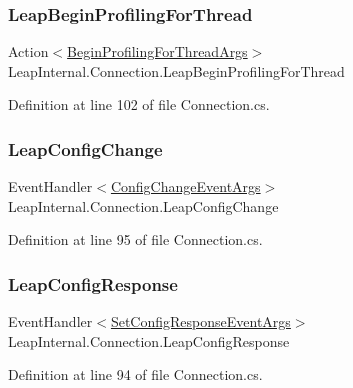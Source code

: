 \subsubsection{\texorpdfstring{LeapBeginProfilingForThread}{LeapBeginProfilingForThread}}
{\footnotesize\ttfamily Action$<$\mbox{\hyperlink{struct_leap_1_1_begin_profiling_for_thread_args}{Begin\+Profiling\+For\+Thread\+Args}}$>$ Leap\+Internal.\+Connection.\+Leap\+Begin\+Profiling\+For\+Thread}



Definition at line 102 of file Connection.\+cs.

\mbox{\label{class_leap_internal_1_1_connection_a6f56c66bbecc957ca227d894dcf16e96}} 
\subsubsection{\texorpdfstring{LeapConfigChange}{LeapConfigChange}}
{\footnotesize\ttfamily Event\+Handler$<$\mbox{\hyperlink{class_leap_1_1_config_change_event_args}{Config\+Change\+Event\+Args}}$>$ Leap\+Internal.\+Connection.\+Leap\+Config\+Change}



Definition at line 95 of file Connection.\+cs.

\mbox{\label{class_leap_internal_1_1_connection_a87dae2d17dfa76d622d710bf69c08c82}} 
\subsubsection{\texorpdfstring{LeapConfigResponse}{LeapConfigResponse}}
{\footnotesize\ttfamily Event\+Handler$<$\mbox{\hyperlink{class_leap_1_1_set_config_response_event_args}{Set\+Config\+Response\+Event\+Args}}$>$ Leap\+Internal.\+Connection.\+Leap\+Config\+Response}



Definition at line 94 of file Connection.\+cs.

\mbox{\label{class_leap_internal_1_1_connection_a352433b853a548790c8ad350e948fdd6}} 
